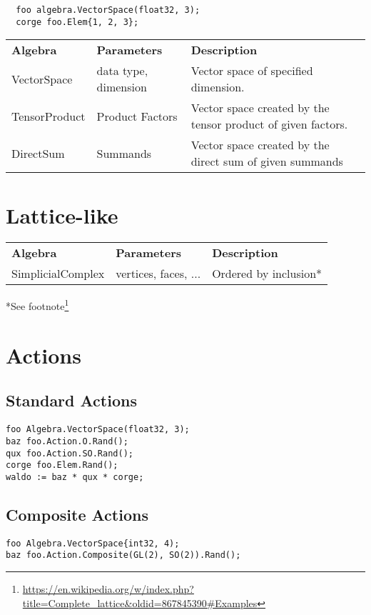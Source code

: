 \documentclass{amsbook}
\begin{document}
\begin{verbatim}
  foo algebra.VectorSpace(float32, 3);
  corge foo.Elem{1, 2, 3};
\end{verbatim}

\begin{tabular}{lll}
  \textbf{Algebra} & \textbf{Parameters} & \textbf{Description} \\
  VectorSpace & data type, dimension & Vector space of specified dimension.\\
  TensorProduct & Product Factors & Vector space created by the tensor product of given factors.\\
  DirectSum & Summands & Vector space created by the direct sum of given summands\\
\end{tabular}

\section{Lattice-like}

\begin{tabular}{lll}
  \textbf{Algebra} & \textbf{Parameters} & \textbf{Description} \\
  SimplicialComplex & vertices, faces, ... & Ordered by inclusion*
\end{tabular}

*See footnote\footnote{\url{https://en.wikipedia.org/w/index.php?title=Complete_lattice&oldid=867845390\#Examples}}

\section{Actions}

\subsection{Standard Actions}

\begin{verbatim}
foo Algebra.VectorSpace(float32, 3);
baz foo.Action.O.Rand();
qux foo.Action.SO.Rand();
corge foo.Elem.Rand();
waldo := baz * qux * corge;
\end{verbatim}

\subsection{Composite Actions}

\begin{verbatim}
foo Algebra.VectorSpace{int32, 4);
baz foo.Action.Composite(GL(2), SO(2)).Rand();
\end{verbatim}
\end{document}
